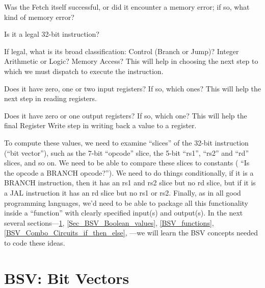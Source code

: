 \begin{tightlist}

 \item Was the Fetch itself successful, or did it encounter a memory
   error; if so, what kind of memory error?

 \item Is it a legal 32-bit instruction?

 \item If legal, what is its broad classification: Control (Branch or
   Jump)? Integer Arithmetic or Logic? Memory Access?  This will help
   in choosing the next step to which we must dispatch to execute the
   instruction.

 \item Does it have zero, one or two input registers?  If so, which
   ones?  This will help the next step in reading registers.

 \item Does it have zero or one output registers?  If so, which one?
   This will help the final Register Write step in writing back a
   value to a register.

\end{tightlist}

To compute these values, we need to examine ``slices'' of the 32-bit
instruction (``bit vector''), such as the 7-bit ``opcode'' slice, the
5-bit ``rs1'', ``rs2'' and ``rd'' slices, and so on.  We need to be
able to compare these slices to constants ({\eg} ``Is the opcode a
BRANCH opcode?'').  We need to do things conditionally, {\eg} if it is
a BRANCH instruction, then it has an rs1 and rs2 slice but no rd
slice, but if it is a JAL instruction it has an rd slice but no rs1 or
rs2.  Finally, as in all good programming languages, we'd need to be
able to package all this functionality inside a ``function'' with
clearly specified input(s) and output(s).  In the next several
sections---\ref{Sec_BSV_Bit_Vectors}, \ref{Sec_BSV_Boolean_values},
\ref{BSV_functions}, \ref{BSV_Combo_Circuits_if_then_else}, ---we will
learn the BSV concepts needed to code these ideas.


\section{BSV: Bit Vectors}

\label{Sec_BSV_Bit_Vectors}


